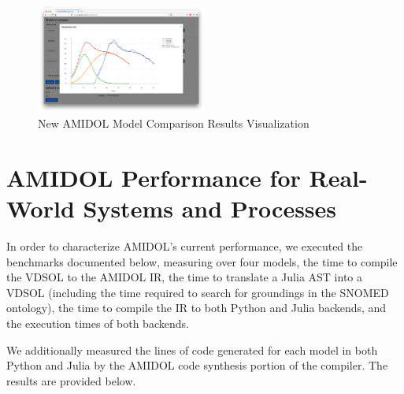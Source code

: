 \documentclass[12pt]{galois-whitepaper}
\begin{document}
\begin{figure}
  \centering
  \includegraphics[width=0.5\textwidth]{figs/SIIR_visualize_comparision.png}
  \caption{New AMIDOL Model Comparison Results Visualization}
  \label{Fig:Viz}
\end{figure}

\section{AMIDOL Performance for Real-World Systems and Processes}

In order to characterize AMIDOL's current performance, we executed the
benchmarks documented below, measuring over four models, the time to
compile the VDSOL to the AMIDOL IR, the time to translate a Julia AST
into a VDSOL (including the time required to search for groundings in
the SNOMED ontology), the time to compile the IR to both Python and
Julia backends, and the execution times of both backends.

We additionally measured the lines of code generated for each model in
both Python and Julia by the AMIDOL code synthesis portion of the
compiler.  The results are provided below.
\end{document}

